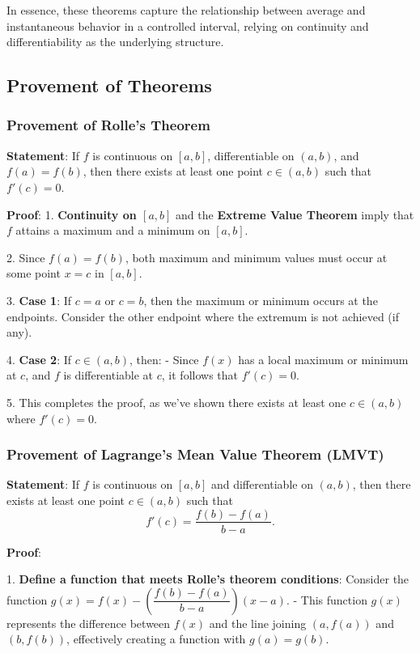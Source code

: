 \documentclass[a4paper,12pt]{book}
\begin{document}
In essence, these theorems capture the relationship between average and instantaneous behavior in a controlled interval, relying on continuity and differentiability as the underlying structure.

\subsection{Provement of Theorems}

\subsubsection{Provement of Rolle's Theorem}

\textbf{Statement}: If \( f \) is continuous on \([a, b]\), differentiable on \((a, b)\), and \( f(a) = f(b) \), then there exists at least one point \( c \in (a, b) \) such that \( f'(c) = 0 \).

\textbf{Proof}:
1. \textbf{Continuity on \([a, b]\)} and the \textbf{Extreme Value Theorem} imply that \( f \) attains a maximum and a minimum on \([a, b]\).

2. Since \( f(a) = f(b) \), both maximum and minimum values must occur at some point \( x = c \) in \([a, b]\).

3. \textbf{Case 1}: If \( c = a \) or \( c = b \), then the maximum or minimum occurs at the endpoints. Consider the other endpoint where the extremum is not achieved (if any).

4. \textbf{Case 2}: If \( c \in (a, b) \), then:
- Since \( f(x) \) has a local maximum or minimum at \( c \), and \( f \) is differentiable at \( c \), it follows that \( f'(c) = 0 \).

5. This completes the proof, as we’ve shown there exists at least one \( c \in (a, b) \) where \( f'(c) = 0 \).

\subsubsection{Provement of Lagrange’s Mean Value Theorem (LMVT)}

\textbf{Statement}: If \( f \) is continuous on \([a, b]\) and differentiable on \((a, b)\), then there exists at least one point \( c \in (a, b) \) such that
\[
f'(c) = \dfrac{f(b) - f(a)}{b - a}.
\]

\textbf{Proof}:

1. \textbf{Define a function that meets Rolle's theorem conditions}: Consider the function \( g(x) = f(x) - \left( \dfrac{f(b) - f(a)}{b - a} \right)(x - a) \).
- This function \( g(x) \) represents the difference between \( f(x) \) and the line joining \( (a, f(a)) \) and \( (b, f(b)) \), effectively creating a function with \( g(a) = g(b) \).
\end{document}
